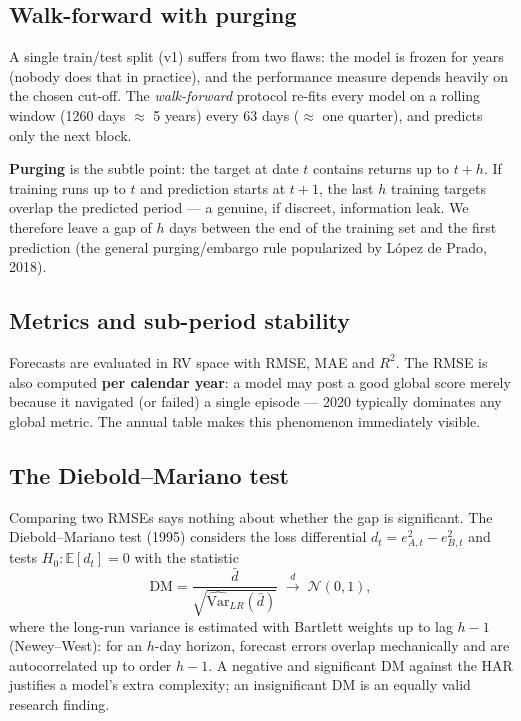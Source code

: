 \documentclass[11pt,a4paper]{article}
\newcommand{\E}{\mathbb{E}}
\begin{document}
\subsection{Walk-forward with purging}
\label{sec:wf}

A single train/test split (v1) suffers from two flaws: the model is frozen
for years (nobody does that in practice), and the performance measure depends
heavily on the chosen cut-off. The \emph{walk-forward} protocol re-fits every
model on a rolling window (1260 days $\approx$ 5 years) every 63 days
($\approx$ one quarter), and predicts only the next block.

\textbf{Purging} is the subtle point: the target at date $t$ contains returns
up to $t+h$. If training runs up to $t$ and prediction starts at $t+1$, the
last $h$ training targets overlap the predicted period --- a genuine, if
discreet, information leak. We therefore leave a gap of $h$ days between the
end of the training set and the first prediction (the general
purging/embargo rule popularized by López de Prado, 2018).

\subsection{Metrics and sub-period stability}

Forecasts are evaluated in RV space with RMSE, MAE and $R^2$. The RMSE is
also computed \textbf{per calendar year}: a model may post a good global
score merely because it navigated (or failed) a single episode --- 2020
typically dominates any global metric. The annual table makes this phenomenon
immediately visible.

\subsection{The Diebold--Mariano test}

Comparing two RMSEs says nothing about whether the gap is significant. The
Diebold--Mariano test (1995) considers the loss differential
$d_t = e_{A,t}^2 - e_{B,t}^2$ and tests $H_0 : \E[d_t]=0$ with the statistic
\begin{equation}
\mathrm{DM} = \frac{\bar{d}}{\sqrt{\widehat{\mathrm{Var}}_{LR}(\bar d)}}
\;\xrightarrow{d}\; \mathcal{N}(0,1),
\end{equation}
where the long-run variance is estimated with Bartlett weights up to lag
$h-1$ (Newey--West): for an $h$-day horizon, forecast errors overlap
mechanically and are autocorrelated up to order $h-1$. A negative and
significant DM against the HAR justifies a model's extra complexity; an
insignificant DM is an equally valid research finding.
\end{document}
